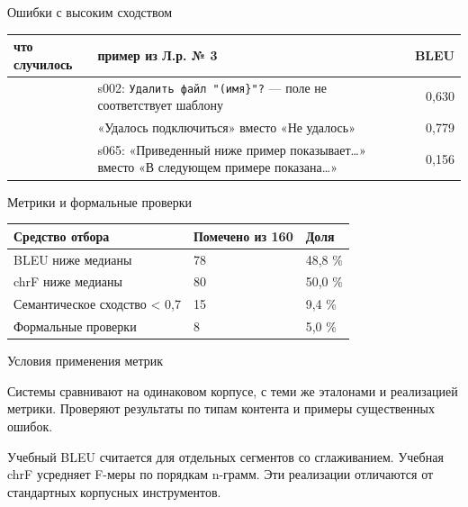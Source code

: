\documentclass[aspectratio=169,12pt]{beamer}
\newcommand{\пр}{\kern0.04em\vrule height0.45ex depth0pt width0.06em%
  \vrule height0.06em depth0pt width0.42em\vrule height0.45ex depth0pt width0.06em\kern0.04em}
\newcommand{\формула}[1]{\par\vspace{0.25em}{\centering$\displaystyle #1$\par}\vspace{0.25em}}
\newcommand{\блок}[3]{%
  \vspace{1.4cm}
  {\color{brick}\small\bfseries БЛОК #1\par}
  \vspace{0.6cm}
  {\color{navy}\fontsize{28}{32}\selectfont\bfseries #2\par}
  \vspace{0.6cm}
  {\color{ink}\large #3\par}}
\begin{document}
\begin{frame}{Ошибки с высоким сходством}
\color{ink}
  \relax
  {\small
  \begin{tabular}{@{}Л{0.25}Л{0.47}r@{}}
    \toprule
    что случилось & пример из Л.р. № 3 & BLEU \\
    \midrule
    \leavevmode{} & s002: \texttt{Удалить файл "(имя\}"?} — поле не соответствует шаблону & 0,630 \\
    \leavevmode{} & «Удалось подключиться» вместо «Не удалось» & 0,779 \\
    \leavevmode{} & s065: «Приведенный ниже пример показывает…» вместо
      «В следующем примере показана…» & 0,156 \\
    \bottomrule
  \end{tabular}}

  \vspace{0.7em}
\end{frame}

\begin{frame}{Метрики и формальные проверки}
\color{ink}
{\small\renewcommand{\arraystretch}{1.15}\begin{tabular}{@{}Л{0.53} Л{0.23} Л{0.16}@{}}\toprule
Средство отбора & Помечено из 160 & Доля\\\midrule
BLEU ниже медианы & 78 & 48,8 \%\\[0.3em]
chrF ниже медианы & 80 & 50,0 \%\\[0.3em]
Семантическое сходство < 0,7 & 15 & 9,4 \%\\[0.3em]
Формальные проверки & 8 & 5,0 \%\\[0.3em]\bottomrule\end{tabular}}
\end{frame}

\begin{frame}{Условия применения метрик}
\color{ink}
{\small Системы сравнивают на одинаковом корпусе, с теми же эталонами и реализацией метрики. Проверяют результаты по типам контента и примеры существенных ошибок.\par\vspace{0.6em}Учебный BLEU считается для отдельных сегментов со сглаживанием. Учебная chrF усредняет F-меры по порядкам n-грамм. Эти реализации отличаются от стандартных корпусных инструментов.}
\end{frame}
\end{document}
